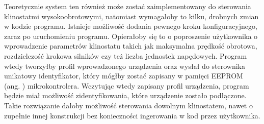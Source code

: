 Teoretycznie system ten również może zostać zaimplementowany do sterowania klinostatmi wysokoobrotowymi, natomiast wymagałoby to kilku, drobnych zmian w kodzie programu. Istnieje możliwość dodania pewnego kroku konfiguracyjnego, zaraz po uruchomieniu programu. Opierałoby się to o poproszenie użytkownika o wprowadzenie parametrów klinostatu takich jak maksymalna prędkość obrotowa, rozdzielczość krokowa silników czy też liczba jednostek napędowych. Program wtedy tworzyłby profil wprowadzonego urządzenia oraz wysłał do sterownika unikatowy identyfikator, który mógłby zostać zapisany w pamięci EEPROM (ang. ) mikrokontrolera. Wczytując wtedy zapisany profil urządzenia, program będzie miał możliwość zidentyfikowania, które urządzenie zostało podłączone. Takie rozwiązanie dałoby możliwość sterowania dowolnym klinostatem, nawet o zupełnie innej konstrukcji bez konieczności ingerowania w kod przez użytkownika.

